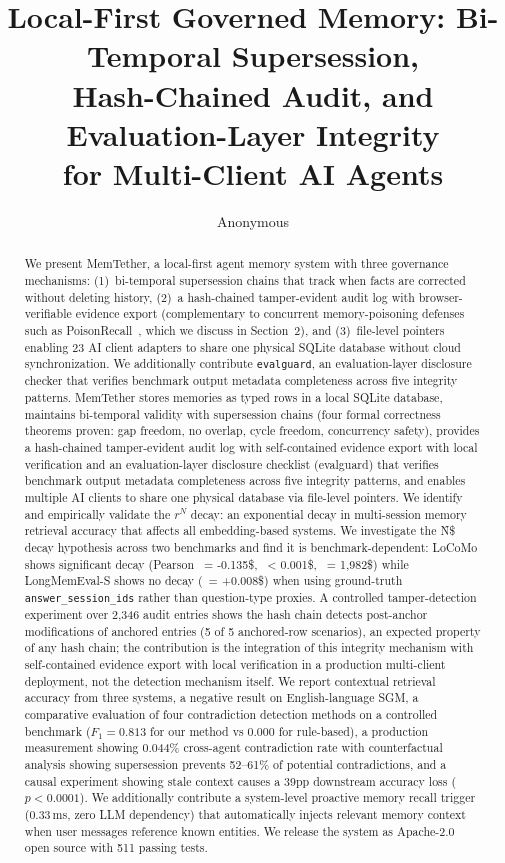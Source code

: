 \documentclass{article}
\title{Local-First Governed Memory: Bi-Temporal Supersession,\\ Hash-Chained Audit, and Evaluation-Layer Integrity\\ for Multi-Client AI Agents}
\author{Anonymous}
\date{}
\begin{document}
\maketitle

\begin{abstract}
We present MemTether, a local-first agent memory system with three governance mechanisms: (1)~bi-temporal supersession chains that track when facts are corrected without deleting history, (2)~a hash-chained tamper-evident audit log with browser-verifiable evidence export (complementary to concurrent memory-poisoning defenses such as PoisonRecall~\citep{poisonrecall}, which we discuss in Section~2), and (3)~file-level pointers enabling 23 AI client adapters to share one physical SQLite database without cloud synchronization. We additionally contribute \texttt{evalguard}, an evaluation-layer disclosure checker that verifies benchmark output metadata completeness across five integrity patterns. MemTether stores memories as typed rows in a local SQLite database, maintains bi-temporal validity with supersession chains (four formal correctness theorems proven: gap freedom, no overlap, cycle freedom, concurrency safety), provides a hash-chained tamper-evident audit log with self-contained evidence export with local verification and an evaluation-layer disclosure checklist (evalguard) that verifies benchmark output metadata completeness across five integrity patterns, and enables multiple AI clients to share one physical database via file-level pointers. We identify and empirically validate the $r^N$ decay: an exponential decay in multi-session memory retrieval accuracy that affects all embedding-based systems. We investigate the \^N\$ decay hypothesis across two benchmarks and find it is benchmark-dependent: LoCoMo shows significant decay (Pearson \ = -0.135\$, \ < 0.001\$, \ = 1{,}982\$) while LongMemEval-S shows no decay (\ = +0.008\$) when using ground-truth \texttt{answer\_session\_ids} rather than question-type proxies. A controlled tamper-detection experiment over 2{,}346 audit entries shows the hash chain detects post-anchor modifications of anchored entries (5 of 5 anchored-row scenarios), an expected property of any hash chain; the contribution is the integration of this integrity mechanism with self-contained evidence export with local verification in a production multi-client deployment, not the detection mechanism itself. We report contextual retrieval accuracy from three systems, a negative result on English-language SGM, a comparative evaluation of four contradiction detection methods on a controlled benchmark ($F_1 = 0.813$ for our method vs 0.000 for rule-based), a production measurement showing 0.044\% cross-agent contradiction rate with counterfactual analysis showing supersession prevents 52--61\% of potential contradictions, and a causal experiment showing stale context causes a 39pp downstream accuracy loss ($p < 0.0001$). We additionally contribute a system-level proactive memory recall trigger (0.33\,ms, zero LLM dependency) that automatically injects relevant memory context when user messages reference known entities. We release the system as Apache-2.0 open source with 511 passing tests.
\end{abstract}
\end{document}
